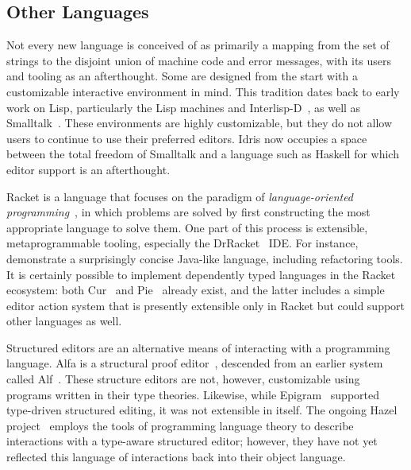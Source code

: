 
\subsection{Other Languages}

Not every new language is conceived of as primarily a mapping from the
set of strings to the disjoint union of machine code and error
messages, with its users and tooling as an afterthought. Some are
designed from the start with a customizable interactive environment in
mind. This tradition dates back to early work on Lisp, particularly
the Lisp machines and Interlisp-D~\citep{LispHist}, as well as
Smalltalk~\citep{Goldberg1984SmalltalkEnv}. These environments are
highly customizable, but they do not allow users to continue to use
their preferred editors. Idris now occupies a space between the total
freedom of Smalltalk and a language such as Haskell for which editor
support is an afterthought.

Racket is a language that focuses on the paradigm of
\emph{language-oriented programming}~\citep{racketManifesto}, in which
problems are solved by first constructing the most appropriate
language to solve them. One part of this process is extensible,
metaprogrammable tooling, especially the DrRacket~\cite{revenge}
IDE. For instance, \citet{feltey2016languages} demonstrate a
surprisingly concise Java-like language, including refactoring tools.
It is certainly possible to implement dependently typed languages in
the Racket ecosystem: both Cur~\cite{cur} and
Pie~\cite{theLittleTyper} already exist, and the latter includes a
simple editor action system that is presently extensible only in
Racket but could support other languages as well.

Structured editors are an alternative means of interacting with a
programming language.  Alfa is a structural proof editor~\cite{alfa},
descended from an earlier system called Alf~\citep{ALF, ALFthesis}.
These structure editors are not, however, customizable using programs
written in their type theories. Likewise, while
Epigram~\citep{epigram} supported type-driven structured editing, it
was not extensible in itself. The ongoing Hazel
project~\cite{hazelnut,hazelEditor} employs the tools of programming
language theory to describe interactions with a type-aware structured
editor; however, they have not yet reflected this language of
interactions back into their object language.



